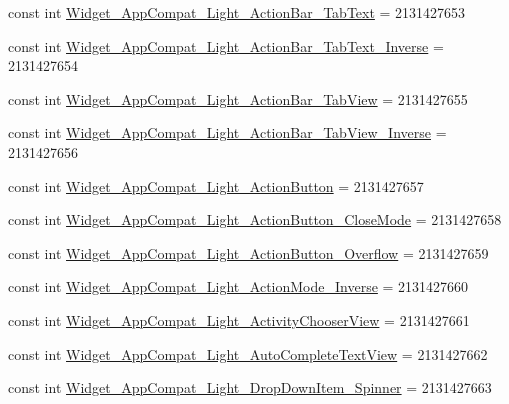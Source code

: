 \begin{DoxyCompactItemize}
\item 
const int \mbox{\hyperlink{class_f_w_p_s___app_1_1_droid_1_1_resource_1_1_style_a91183ca3b2807f2eb64ab92377147b51}{Widget\+\_\+\+App\+Compat\+\_\+\+Light\+\_\+\+Action\+Bar\+\_\+\+Tab\+Text}} = 2131427653
\item 
const int \mbox{\hyperlink{class_f_w_p_s___app_1_1_droid_1_1_resource_1_1_style_a83dfce117fe8c3553389eaa5fc602235}{Widget\+\_\+\+App\+Compat\+\_\+\+Light\+\_\+\+Action\+Bar\+\_\+\+Tab\+Text\+\_\+\+Inverse}} = 2131427654
\item 
const int \mbox{\hyperlink{class_f_w_p_s___app_1_1_droid_1_1_resource_1_1_style_a2575040bf23f9315d136231941e659c4}{Widget\+\_\+\+App\+Compat\+\_\+\+Light\+\_\+\+Action\+Bar\+\_\+\+Tab\+View}} = 2131427655
\item 
const int \mbox{\hyperlink{class_f_w_p_s___app_1_1_droid_1_1_resource_1_1_style_a55a62c453787451b707c7c61d308c6bb}{Widget\+\_\+\+App\+Compat\+\_\+\+Light\+\_\+\+Action\+Bar\+\_\+\+Tab\+View\+\_\+\+Inverse}} = 2131427656
\item 
const int \mbox{\hyperlink{class_f_w_p_s___app_1_1_droid_1_1_resource_1_1_style_a0b54a3a2e18d9ed38f4ffaa1434654e7}{Widget\+\_\+\+App\+Compat\+\_\+\+Light\+\_\+\+Action\+Button}} = 2131427657
\item 
const int \mbox{\hyperlink{class_f_w_p_s___app_1_1_droid_1_1_resource_1_1_style_ade9443d3dcb41c14d84274ec82d23c5b}{Widget\+\_\+\+App\+Compat\+\_\+\+Light\+\_\+\+Action\+Button\+\_\+\+Close\+Mode}} = 2131427658
\item 
const int \mbox{\hyperlink{class_f_w_p_s___app_1_1_droid_1_1_resource_1_1_style_aa7fd50cb022e8e775bf90087d3f4659c}{Widget\+\_\+\+App\+Compat\+\_\+\+Light\+\_\+\+Action\+Button\+\_\+\+Overflow}} = 2131427659
\item 
const int \mbox{\hyperlink{class_f_w_p_s___app_1_1_droid_1_1_resource_1_1_style_a514ecda93fc21f7bc8a94e41620f5609}{Widget\+\_\+\+App\+Compat\+\_\+\+Light\+\_\+\+Action\+Mode\+\_\+\+Inverse}} = 2131427660
\item 
const int \mbox{\hyperlink{class_f_w_p_s___app_1_1_droid_1_1_resource_1_1_style_a55ff95cabfec59e98feab72bf315c968}{Widget\+\_\+\+App\+Compat\+\_\+\+Light\+\_\+\+Activity\+Chooser\+View}} = 2131427661
\item 
const int \mbox{\hyperlink{class_f_w_p_s___app_1_1_droid_1_1_resource_1_1_style_a17864ef5166baef148ff5621180f0b56}{Widget\+\_\+\+App\+Compat\+\_\+\+Light\+\_\+\+Auto\+Complete\+Text\+View}} = 2131427662
\item 
const int \mbox{\hyperlink{class_f_w_p_s___app_1_1_droid_1_1_resource_1_1_style_a6a854b5af15356aa36c99ead7b2c644b}{Widget\+\_\+\+App\+Compat\+\_\+\+Light\+\_\+\+Drop\+Down\+Item\+\_\+\+Spinner}} = 2131427663

\end{DoxyCompactItemize}
